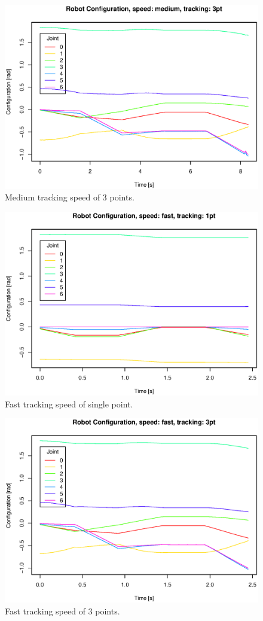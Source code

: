 \begin{figure}[H]
\centering
\includegraphics[width= \linewidth]{graphics/robotics/robotConfiguration_medium_3pt}
\caption{Medium tracking speed of 3 points.}
\label{fig:robotic_conf_medium_3pt}
\end{figure}

\begin{figure}[H]
\centering
\includegraphics[width= \linewidth]{graphics/robotics/robotConfiguration_fast_1pt}
\caption{Fast tracking speed of single point.}
\label{fig:robotic_conf_fast_1pt}
\end{figure}

\begin{figure}[H]
\centering
\includegraphics[width= \linewidth]{graphics/robotics/robotConfiguration_fast_3pt}
\caption{Fast tracking speed of 3 points.}
\label{fig:robotic_conf_fast_3pt}
\end{figure}


